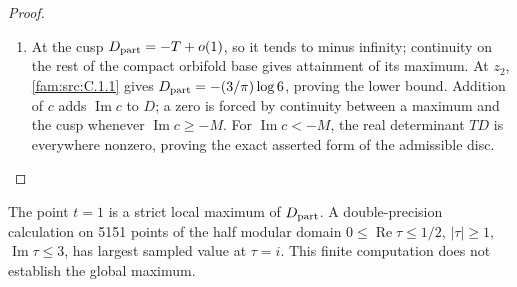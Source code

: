 \begin{proof}
\begin{enumerate}[label=\arabic*.,leftmargin=*]
\item At the cusp \(D_{\rm part}=-T+o(1)\), so it tends to minus infinity;
continuity on the rest of the compact orbifold base gives attainment of
its maximum. At \(z_2\), \ref{fam:src:C.1.1} gives
\(D_{\rm part}=-(3/\pi)\log6\), proving the lower bound. Addition of \(c\)
adds \(\operatorname{Im}c\) to \(D\); a zero is forced by continuity
between a maximum and the cusp whenever \(\operatorname{Im}c\geq-M\).
For \(\operatorname{Im}c<-M\), the real determinant \(TD\) is everywhere
nonzero, proving the exact asserted form of the admissible disc.
\end{enumerate}
\end{proof}

\begin{proposition}\hypertarget{tag-01QK}{}\label{fam:src:C.2.2}\label{fam:st:C.2.2}

The point \(t=1\) is a strict local maximum of \(D_{\rm part}\).
A double-precision calculation on 5151 points of the half modular domain
\(0\leq\operatorname{Re}\tau\leq1/2\), \(|\tau|\geq1\),
\(\operatorname{Im}\tau\leq3\), has largest sampled value at \(\tau=i\).
This finite computation does not establish the global maximum.
\end{proposition}


